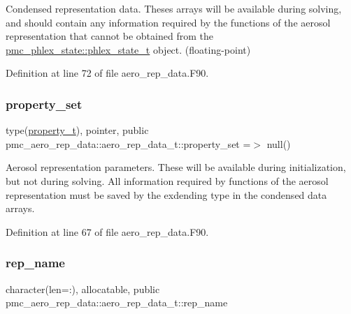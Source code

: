 Condensed representation data. Theses arrays will be available during solving, and should contain any information required by the functions of the aerosol representation that cannot be obtained from the \mbox{\hyperlink{structpmc__phlex__state_1_1phlex__state__t}{pmc\+\_\+phlex\+\_\+state\+::phlex\+\_\+state\+\_\+t}} object. (floating-\/point) 



Definition at line 72 of file aero\+\_\+rep\+\_\+data.\+F90.

\mbox{\label{structpmc__aero__rep__data_1_1aero__rep__data__t_a87b1bf5cd10a0a2b51390fb24ebf56c5}} 
\subsubsection{\texorpdfstring{property\+\_\+set}{property\_set}}
{\footnotesize\ttfamily type(\mbox{\hyperlink{structpmc__property_1_1property__t}{property\+\_\+t}}), pointer, public pmc\+\_\+aero\+\_\+rep\+\_\+data\+::aero\+\_\+rep\+\_\+data\+\_\+t\+::property\+\_\+set =$>$ null()}



Aerosol representation parameters. These will be available during initialization, but not during solving. All information required by functions of the aerosol representation must be saved by the exdending type in the condensed data arrays. 



Definition at line 67 of file aero\+\_\+rep\+\_\+data.\+F90.

\mbox{\label{structpmc__aero__rep__data_1_1aero__rep__data__t_aa5472b007f4f5a9743ff5c8dc7e9c56b}} 
\subsubsection{\texorpdfstring{rep\+\_\+name}{rep\_name}}
{\footnotesize\ttfamily character(len=\+:), allocatable, public pmc\+\_\+aero\+\_\+rep\+\_\+data\+::aero\+\_\+rep\+\_\+data\+\_\+t\+::rep\+\_\+name}



